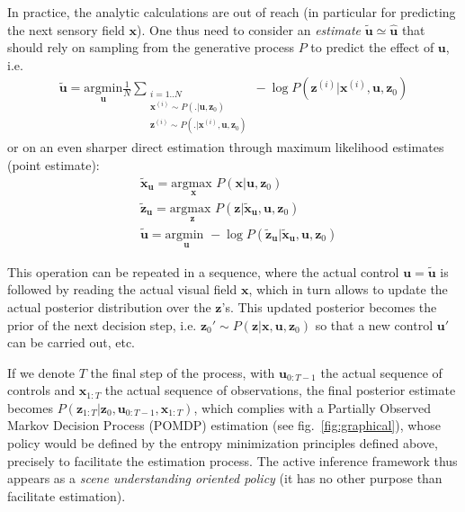 \documentclass{article} %
\begin{document}
	In practice, the analytic calculations are out of reach (in particular for predicting the next sensory field $\boldsymbol{x}$).  One thus need to consider an \emph{estimate} $\tilde{\boldsymbol{u}} \simeq \hat{\boldsymbol{u}}$ that should rely on sampling from the generative process $P$ to 
	predict the effect of $\boldsymbol{u}$,  i.e. 
	\begin{align} \tilde{\boldsymbol{u}} = \underset{\boldsymbol{u}}{\text{argmin}} \frac{1}{N} \sum_{\substack{i = 1..N\\ \boldsymbol{x}^{(i)} \sim P(.|\boldsymbol{u}, \boldsymbol{z}_0)\\ \boldsymbol{z}^{(i)} \sim P(.|\boldsymbol{x}^{(i)}, \boldsymbol{u}, \boldsymbol{z}_0)}} -\log P(\boldsymbol{z}^{(i)}| \boldsymbol{x}^{(i)}, \boldsymbol{u}, \boldsymbol{z}_0) \label{eq:MC} \end{align} or on an even sharper direct estimation through maximum likelihood estimates (point estimate):
	\begin{align}
	&\tilde{\boldsymbol{x}}_{\boldsymbol{u}} = \underset{\boldsymbol{x}}{\text{argmax }} P(\boldsymbol{x}|\boldsymbol{u}, \boldsymbol{z}_0) \label{eq:step-1}\\	
	&\tilde{\boldsymbol{z}}_{\boldsymbol{u}} = \underset{\boldsymbol{z}}{\text{argmax }} P(\boldsymbol{z}|\tilde{\boldsymbol{x}}_{\boldsymbol{u}}, \boldsymbol{u}, \boldsymbol{z}_0) \label{eq:step-2}\\
	&\tilde{\boldsymbol{u}} = \underset{\boldsymbol{u}}{\text{argmin }} - \log P(\tilde{\boldsymbol{z}}_{\boldsymbol{u}}|\tilde{\boldsymbol{x}}_{\boldsymbol{u}}, \boldsymbol{u}, \boldsymbol{z}_0)	\label{eq:step-3}
	\end{align}


This operation can be repeated in a sequence, where the actual control $\boldsymbol{u} = \tilde{\boldsymbol{u}}$ is followed by reading the actual visual field $\boldsymbol{x}$, which in turn allows to update the actual posterior distribution over the $\boldsymbol{z}$'s. This updated posterior becomes the prior of the next decision step, i.e. $\boldsymbol{z}_0'\sim  P(\boldsymbol{z}|\boldsymbol{x}, \boldsymbol{u}, \boldsymbol{z}_0)$ so that a new control $\boldsymbol{u}'$ can be carried out, etc. 

If we denote $T$ the final step of the process,  with $\boldsymbol{u}_{0:T-1}$ the actual sequence of controls and $\boldsymbol{x}_{1:T}$ the actual sequence of observations, the final posterior estimate becomes $P(\boldsymbol{z}_{1:T}|\boldsymbol{z}_0, \boldsymbol{u}_{0:T-1}, \boldsymbol{x}_{1:T})$, which complies with a Partially Observed Markov Decision Process (POMDP) estimation (see fig.~\ref{fig:graphical}), whose policy would be defined by the entropy minimization principles defined above, precisely to facilitate the estimation process. The active inference framework thus appears  as a \emph{scene understanding oriented policy} (it has no other purpose than facilitate estimation).
\end{document}
